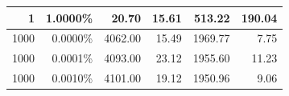\documentclass[12pt,a4paper]{report}
\begin{document}
\begin{table}[htbp]
\begin{tabular}{|r|r|r|r|r|r|}
1                                                                                               & 1.0000\%                                                                                             & 20.70                                                                                                 & 15.61                                                                                                                               & 513.22                                                                                                                                     & 190.04                                                                                                                            \\ \hline
1000                                                                                            & 0.0000\%                                                                                             & 4062.00                                                                                               & 15.49                                                                                                                               & 1969.77                                                                                                                                    & 7.75                                                                                                                              \\ \hline
1000                                                                                            & 0.0001\%                                                                                             & 4093.00                                                                                               & 23.12                                                                                                                               & 1955.60                                                                                                                                    & 11.23                                                                                                                             \\ \hline
1000                                                                                            & 0.0010\%                                                                                             & 4101.00                                                                                               & 19.12                                                                                                                               & 1950.96                                                                                                                                    & 9.06                                                                                                                              \\ \hline

\end{tabular}
\end{table}
\end{document}
